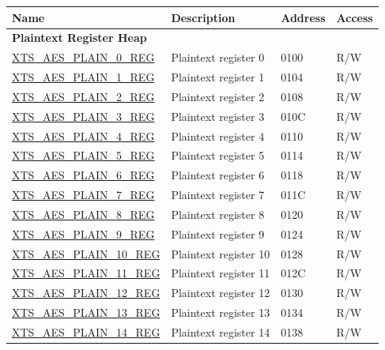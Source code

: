 \begin{longtable}{ | p{6cm} | p{7.2cm} | p{1.3cm} | p{1cm} | }
\hline\rowcolor{lightgray}
Name & Description &  Address & Access \\ \hline
\endhead
\multicolumn{4}{|l|}{\textbf{Plaintext Register Heap}} \\ \hline
\hyperref[regdesc:XTSAESPLAINNREG]{XTS\_AES\_PLAIN\_0\_REG} & Plaintext register 0 & \hexprefix{}0100 & R/W \\ \hline
\hyperref[regdesc:XTSAESPLAINNREG]{XTS\_AES\_PLAIN\_1\_REG} & Plaintext register 1 & \hexprefix{}0104 & R/W \\ \hline
\hyperref[regdesc:XTSAESPLAINNREG]{XTS\_AES\_PLAIN\_2\_REG} & Plaintext register 2 & \hexprefix{}0108 & R/W \\ \hline
\hyperref[regdesc:XTSAESPLAINNREG]{XTS\_AES\_PLAIN\_3\_REG} & Plaintext register 3 & \hexprefix{}010C & R/W \\ \hline
\hyperref[regdesc:XTSAESPLAINNREG]{XTS\_AES\_PLAIN\_4\_REG} & Plaintext register 4 & \hexprefix{}0110 & R/W \\ \hline
\hyperref[regdesc:XTSAESPLAINNREG]{XTS\_AES\_PLAIN\_5\_REG} & Plaintext register 5 & \hexprefix{}0114 & R/W \\ \hline
\hyperref[regdesc:XTSAESPLAINNREG]{XTS\_AES\_PLAIN\_6\_REG} & Plaintext register 6 & \hexprefix{}0118 & R/W \\ \hline
\hyperref[regdesc:XTSAESPLAINNREG]{XTS\_AES\_PLAIN\_7\_REG} & Plaintext register 7 & \hexprefix{}011C & R/W \\ \hline
\hyperref[regdesc:XTSAESPLAINNREG]{XTS\_AES\_PLAIN\_8\_REG} & Plaintext register 8 & \hexprefix{}0120 & R/W \\ \hline
\hyperref[regdesc:XTSAESPLAINNREG]{XTS\_AES\_PLAIN\_9\_REG} & Plaintext register 9 & \hexprefix{}0124 & R/W \\ \hline
\hyperref[regdesc:XTSAESPLAINNREG]{XTS\_AES\_PLAIN\_10\_REG} & Plaintext register 10 & \hexprefix{}0128 & R/W \\ \hline
\hyperref[regdesc:XTSAESPLAINNREG]{XTS\_AES\_PLAIN\_11\_REG} & Plaintext register 11 & \hexprefix{}012C & R/W \\ \hline
\hyperref[regdesc:XTSAESPLAINNREG]{XTS\_AES\_PLAIN\_12\_REG} & Plaintext register 12 & \hexprefix{}0130 & R/W \\ \hline
\hyperref[regdesc:XTSAESPLAINNREG]{XTS\_AES\_PLAIN\_13\_REG} & Plaintext register 13 & \hexprefix{}0134 & R/W \\ \hline
\hyperref[regdesc:XTSAESPLAINNREG]{XTS\_AES\_PLAIN\_14\_REG} & Plaintext register 14 & \hexprefix{}0138 & R/W \\ \hline

\end{longtable}
